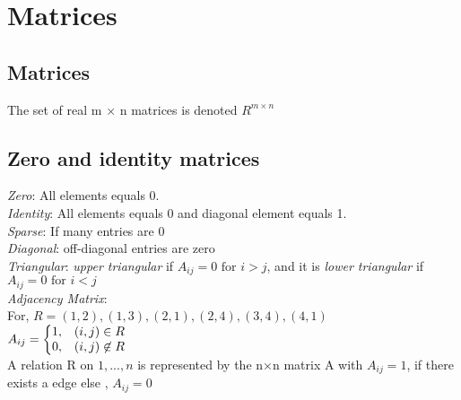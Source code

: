 \section{Matrices}
\subsection{Matrices}
The set of real m × n matrices is denoted $R^{m \times n}$
\subsection{Zero and identity matrices}
\textbullet \textit{Zero}: All elements equals 0.\\
\textbullet \textit{Identity}: All elements equals 0 and diagonal element equals 1.\\
\textbullet \textit{Sparse}: If many entries are 0\\
\textbullet \textit{Diagonal}: off-diagonal entries are zero\\
\textbullet \textit{Triangular}: \textit{upper triangular} if $A_{ij} = 0 \text{ for } i>j$, and it is \textit{lower triangular} if $A_{ij} =0 \text{ for } i<j$\\
\textbullet \textit{Adjacency Matrix}: \\
For, $R={(1,2), (1,3), (2,1), (2,4), (3,4), (4,1)}$\\
$
A_{ij} = \left\{
  \begin{array}{@{}ll@{}}
    1, & (i,j) \in R\\
    0, & (i, j) \not\in R
  \end{array}\right.
$\\
A relation R on ${1,...,n}$ is represented by the n×n matrix A with $A_{ij} = 1$, if there exists a edge else , $A_{ij} = 0$
